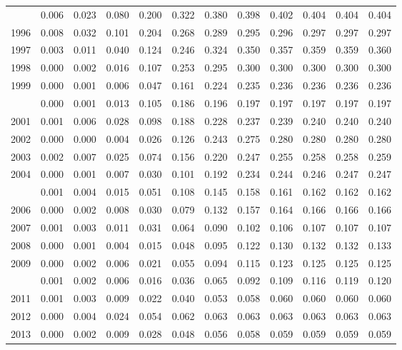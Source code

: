 \documentclass[
]{article}
\begin{document}
\begin{longtable}[t]{lrrrrrrrrrrr}
\addlinespace
1995 & 0.006 & 0.023 & 0.080 & 0.200 & 0.322 & 0.380 & 0.398 & 0.402 & 0.404 & 0.404 & 0.404\\
1996 & 0.008 & 0.032 & 0.101 & 0.204 & 0.268 & 0.289 & 0.295 & 0.296 & 0.297 & 0.297 & 0.297\\
1997 & 0.003 & 0.011 & 0.040 & 0.124 & 0.246 & 0.324 & 0.350 & 0.357 & 0.359 & 0.359 & 0.360\\
1998 & 0.000 & 0.002 & 0.016 & 0.107 & 0.253 & 0.295 & 0.300 & 0.300 & 0.300 & 0.300 & 0.300\\
1999 & 0.000 & 0.001 & 0.006 & 0.047 & 0.161 & 0.224 & 0.235 & 0.236 & 0.236 & 0.236 & 0.236\\
\addlinespace
2000 & 0.000 & 0.001 & 0.013 & 0.105 & 0.186 & 0.196 & 0.197 & 0.197 & 0.197 & 0.197 & 0.197\\
2001 & 0.001 & 0.006 & 0.028 & 0.098 & 0.188 & 0.228 & 0.237 & 0.239 & 0.240 & 0.240 & 0.240\\
2002 & 0.000 & 0.000 & 0.004 & 0.026 & 0.126 & 0.243 & 0.275 & 0.280 & 0.280 & 0.280 & 0.280\\
2003 & 0.002 & 0.007 & 0.025 & 0.074 & 0.156 & 0.220 & 0.247 & 0.255 & 0.258 & 0.258 & 0.259\\
2004 & 0.000 & 0.001 & 0.007 & 0.030 & 0.101 & 0.192 & 0.234 & 0.244 & 0.246 & 0.247 & 0.247\\
\addlinespace
2005 & 0.001 & 0.004 & 0.015 & 0.051 & 0.108 & 0.145 & 0.158 & 0.161 & 0.162 & 0.162 & 0.162\\
2006 & 0.000 & 0.002 & 0.008 & 0.030 & 0.079 & 0.132 & 0.157 & 0.164 & 0.166 & 0.166 & 0.166\\
2007 & 0.001 & 0.003 & 0.011 & 0.031 & 0.064 & 0.090 & 0.102 & 0.106 & 0.107 & 0.107 & 0.107\\
2008 & 0.000 & 0.001 & 0.004 & 0.015 & 0.048 & 0.095 & 0.122 & 0.130 & 0.132 & 0.132 & 0.133\\
2009 & 0.000 & 0.002 & 0.006 & 0.021 & 0.055 & 0.094 & 0.115 & 0.123 & 0.125 & 0.125 & 0.125\\
\addlinespace
2010 & 0.001 & 0.002 & 0.006 & 0.016 & 0.036 & 0.065 & 0.092 & 0.109 & 0.116 & 0.119 & 0.120\\
2011 & 0.001 & 0.003 & 0.009 & 0.022 & 0.040 & 0.053 & 0.058 & 0.060 & 0.060 & 0.060 & 0.060\\
2012 & 0.000 & 0.004 & 0.024 & 0.054 & 0.062 & 0.063 & 0.063 & 0.063 & 0.063 & 0.063 & 0.063\\
2013 & 0.000 & 0.002 & 0.009 & 0.028 & 0.048 & 0.056 & 0.058 & 0.059 & 0.059 & 0.059 & 0.059\\

\end{longtable}
\end{document}
